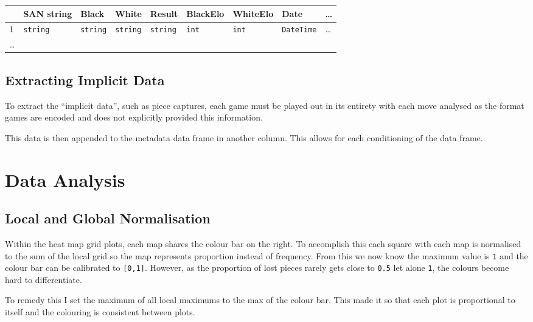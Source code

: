\documentclass[11pt]{article}
\begin{document}
\begin{center}
\begin{tabular}{lllllllll}
 & SAN string & Black & White & Result & BlackElo & WhiteElo & Date & \ldots{}\\
\hline
1 & \texttt{string} & \texttt{string} & \texttt{string} & \texttt{string} & \texttt{int} & \texttt{int} & \texttt{DateTime} & \ldots{}\\
\ldots{} &  &  &  &  &  &  &  & \\
\end{tabular}
\end{center}

\subsection{Extracting Implicit Data}
\label{sec:orge0a0cb3}
To extract the ``implicit data'', such as piece captures, each game must be played out in its entirety with each move analysed as the format games are encoded and does not explicitly provided this information.

This data is then appended to the metadata data frame in another column. This allows for each conditioning of the data frame.
\section{Data Analysis}
\label{sec:orge71ed41}
\subsection{Local and Global Normalisation}
\label{sec:org306f64e}
Within the heat map grid plots, each map shares the colour bar on the right. To accomplish this each square with each map is normalised to the sum of the local grid so the map represents proportion instead of frequency. From this we now know the maximum value is \texttt{1} and the colour bar can be calibrated to \texttt{[0,1]}. However, as the proportion of lost pieces rarely gets close to \texttt{0.5} let alone \texttt{1}, the colours become hard to differentiate.

To remedy this I set the maximum of all local maximums to the max of the colour bar. This made it so that each plot is proportional to itself and the colouring is consistent between plots.
\end{document}

